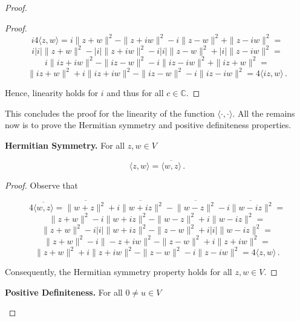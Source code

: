 \documentclass[a4paper]{article}
\newcommand{\br} [1] {\overline{#1}}
\numberwithin{equation}{section}
\begin{document}
\begin{description}
\begin{proof}
\begin{description}
\begin{proof}
$$i4\langle z,w \rangle = i\|z+w\|^2 -\|z+iw\|^2 - i\|z-w\|^2 + \|z-iw\|^2 =$$
$$ i|i|\|z+w\|^2 -|i|\|z+iw\|^2 - i|i|\|z-w\|^2 + |i|\|z-iw\|^2 = $$
$$i\|iz+iw\|^2 -\|iz-w\|^2 - i\|iz-iw\|^2 + \|iz+w\|^2 = $$
$$\|iz+w\|^2 + i\|iz+iw\|^2 -\|iz-w\|^2 - i\|iz-iw\|^2 = 4\langle iz,w \rangle\,.$$

Hence, linearity holds for $i$ and thus for all $c \in \mathbb{C}$.

\end{proof}

\end{description}


This concludes the proof for the linearity of the function $\langle \cdot,\cdot \rangle$. All the remains now is to prove the Hermitian symmetry and positive definiteness properties.


\begin{description}

\item\textbf{Hermitian Symmetry.} For all $z,w \in V$

$$\langle z,w \rangle = \overline{\langle w,z \rangle}\,.$$

\begin{proof} Observe that

$$4\overline{\langle w,z \rangle} = \br{\|w+z\|^2} +\br{i\|w+iz\|^2} - \br{\|w-z\|^2} - \br{i\|w-iz\|^2} = $$
$$\|z+w\|^2 - i\|w+iz\|^2 - \|w-z\|^2 + i\|w-iz\|^2 = $$
$$\|z+w\|^2 - i|i|\|w+iz\|^2 - \|z-w\|^2 + i|i|\|w-iz\|^2 = $$
$$\|z+w\|^2 - i\|-z+iw\|^2 - \|z-w\|^2 + i\|z+iw\|^2  = $$
$$\|z+w\|^2 + i\|z+iw\|^2 - \|z-w\|^2 - i\|z-iw\|^2 = 4\langle z,w \rangle\,.$$

Consequently, the Hermitian symmetry property holds for all $z,w \in V$.

\end{proof}

\end{description}



\begin{description}

\item\textbf{Positive Definiteness.} For all $0 \neq u \in V$


\end{description}
\end{proof}
\end{description}
\end{document}

